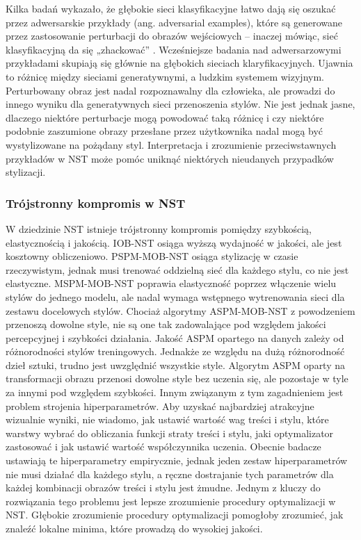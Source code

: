 \documentclass[12pt]{article}
\begin{document}
Kilka badań wykazało, że głębokie sieci klasyfikacyjne łatwo dają się oszukać przez adwersarskie przykłady (ang. adversarial examples), które są generowane przez zastosowanie perturbacji do obrazów wejściowych – inaczej mówiąc, sieć klasyfikacyjną da się „zhackować” \cite{53,54}. Wcześniejsze badania nad adwersarzowymi przykładami skupiają się głównie na głębokich sieciach klaryfikacyjnych. Ujawnia to różnicę między sieciami generatywnymi, a ludzkim systemem wizyjnym. Perturbowany obraz jest nadal rozpoznawalny dla człowieka, ale prowadzi do innego wyniku dla generatywnych sieci przenoszenia stylów. Nie jest jednak jasne, dlaczego niektóre perturbacje mogą powodować taką różnicę i czy niektóre podobnie zaszumione obrazy przesłane przez użytkownika nadal mogą być wystylizowane na pożądany styl. Interpretacja i zrozumienie przeciwstawnych przykładów w NST może pomóc uniknąć niektórych nieudanych przypadków stylizacji.

\subsubsection{Trójstronny kompromis w NST}

\indent

W dziedzinie NST istnieje trójstronny kompromis pomiędzy szybkością, elastycznością i jakością. IOB-NST osiąga wyższą wydajność w jakości, ale jest kosztowny obliczeniowo. PSPM-MOB-NST osiąga stylizację w czasie rzeczywistym, jednak musi trenować oddzielną sieć dla każdego stylu, co nie jest elastyczne. MSPM-MOB-NST poprawia elastyczność poprzez włączenie wielu stylów do jednego modelu, ale nadal wymaga wstępnego wytrenowania sieci dla zestawu docelowych stylów. Chociaż algorytmy ASPM-MOB-NST z powodzeniem przenoszą dowolne style, nie są one tak zadowalające pod względem jakości percepcyjnej i szybkości działania. Jakość ASPM opartego na danych zależy od różnorodności stylów treningowych. Jednakże ze względu na dużą różnorodność dzieł sztuki, trudno jest uwzględnić wszystkie style. Algorytm ASPM oparty na transformacji obrazu przenosi dowolne style bez uczenia się, ale pozostaje w tyle za innymi pod względem szybkości. Innym związanym z tym zagadnieniem jest problem strojenia hiperparametrów. Aby uzyskać najbardziej atrakcyjne wizualnie wyniki, nie wiadomo, jak ustawić wartość wag treści i stylu, które warstwy wybrać do obliczania funkcji straty treści i stylu, jaki optymalizator zastosować i jak ustawić wartość współczynnika uczenia. Obecnie badacze ustawiają te hiperparametry empirycznie, jednak jeden zestaw hiperparametrów nie musi działać dla każdego stylu, a ręczne dostrajanie tych parametrów dla każdej kombinacji obrazów treści i stylu jest żmudne. Jednym z kluczy do rozwiązania tego problemu jest lepsze zrozumienie procedury optymalizacji w NST. Głębokie zrozumienie procedury optymalizacji pomogłoby zrozumieć, jak znaleźć lokalne minima, które prowadzą do wysokiej jakości.
\end{document}
